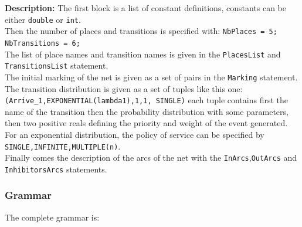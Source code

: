 \documentclass{article}
\begin{document}
{\bf Description:}
The first block is a list of constant definitions, constants can be
either \verb|double| or \verb|int|.\\
Then the number of places and transitions is specified with:
\verb|NbPlaces = 5; NbTransitions = 6;|\\
The list of place names and transition names is given in the
\verb|PlacesList| and \verb|TransitionsList| statement.\\
The initial marking of the net is given as a set of pairs
in the \verb|Marking| statement.\\
The transition distribution is given as a set of tuples like
this one:\\ \verb|(Arrive_1,EXPONENTIAL(lambda1),1,1, SINGLE)|
each tuple contains first the name of the transition then
the probability distribution with some parameters, then two positive
reals defining the priority and weight of the event generated.
For an exponential distribution,  the policy of service can be specified
by \verb|SINGLE,INFINITE,MULTIPLE(n)|.\\
Finally comes the description of the arcs of the net with the 
\verb|InArcs|,\verb|OutArcs| and \verb|InhibitorsArcs| statements.



\subsubsection{Grammar}
The complete grammar is:
\end{document}
